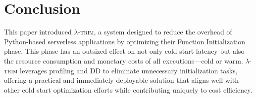 \documentclass[sigplan,nonacm]{acmart}
\newcommand{\sys}{\textsc{\ensuremath{\lambda}-trim}\xspace}
\begin{document}
 
\section{Conclusion}

This paper introduced \sys, a system designed to reduce the overhead of Python-based serverless applications by optimizing their Function Initialization phase.
This phase has an outsized effect on not only cold start latency but also the resource consumption and monetary costs of all executions---cold or warm.
\sys leverages profiling and DD to eliminate unnecessary initialization tasks, offering a practical and immediately deployable solution that aligns well with other cold start optimization efforts while contributing uniquely to cost efficiency.

 


{


}
\end{document}
